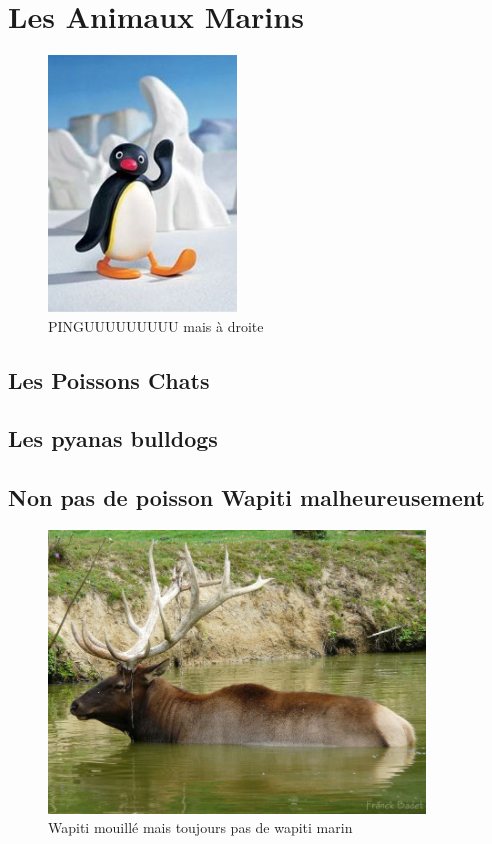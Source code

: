 \section{Les Animaux Marins}


\begin{figure}[ht]
\flushright
    \includegraphics[width=5cm]{paper/figures/pingu.jpg}
    \caption{PINGUUUUUUUUU mais à droite}
    \label{fig:pingu}
\end{figure}




\subsection{Les Poissons Chats}
\lipsum[10-12]

\subsection{Les pyanas bulldogs}
\lipsum[13-15]

\lipsum[3-5]

\subsection{Non pas de poisson Wapiti malheureusement}
\begin{figure}[htbp]
  \centering
  \includegraphics[width=10cm]{paper/figures/wapitieau.jpg}
  \caption{Wapiti mouillé mais toujours pas de wapiti marin}
  \label{fig:wapitieau}
\end{figure}
\lipsum[16-18]